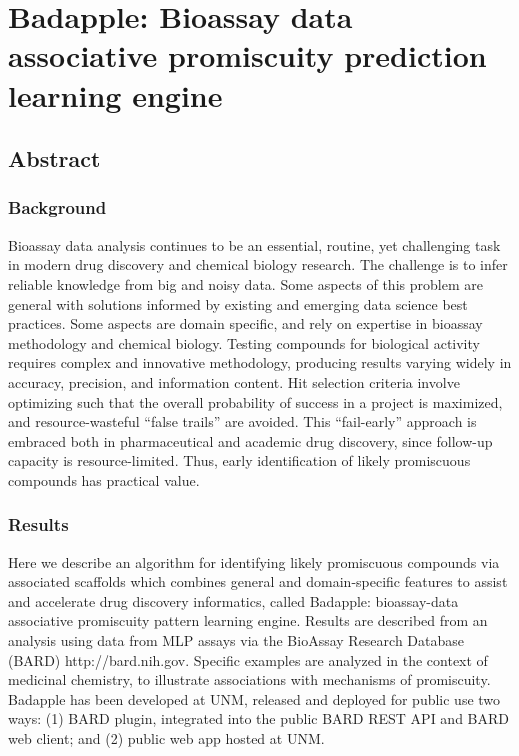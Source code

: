 \chapter{Badapple: Bioassay data associative promiscuity prediction learning engine}

\section{Abstract}

\subsection{Background}

Bioassay data analysis continues to be an essential, routine, yet challenging task in modern drug discovery and chemical biology research. The challenge is to infer reliable knowledge from big and noisy data. Some aspects of this problem are general with solutions informed by existing and emerging data science best practices. Some aspects are domain specific, and rely on expertise in bioassay methodology and chemical biology. Testing compounds for biological activity requires complex and innovative methodology, producing results varying widely in accuracy, precision, and information content. Hit selection criteria involve optimizing such that the overall probability of success in a project is maximized, and resource-wasteful “false trails” are avoided. This “fail-early” approach is embraced both in pharmaceutical and academic drug discovery, since follow-up capacity is resource-limited. Thus, early identification of likely promiscuous compounds has practical value.

\subsection{Results}

Here we describe an algorithm for identifying likely promiscuous compounds via associated scaffolds which combines general and domain-specific features to assist and accelerate drug discovery informatics, called Badapple: bioassay-data associative promiscuity pattern learning engine. Results are described from an analysis using data from MLP assays via the BioAssay Research Database (BARD) http://bard.nih.gov. Specific examples are analyzed in the context of medicinal chemistry, to illustrate associations with mechanisms of promiscuity. Badapple has been developed at UNM, released and deployed for public use two ways: (1) BARD plugin, integrated into the public BARD REST API and BARD web client; and (2) public web app hosted at UNM.

